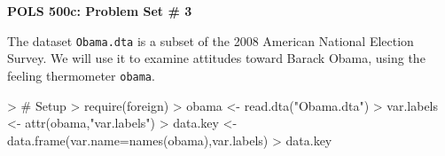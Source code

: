 \documentclass[12pt]{article}
\begin{document}


\pagestyle{empty}

\begin{center}
{\Large \textbf{POLS 500c: Problem Set \# 3}}
\end{center}

The dataset \texttt{Obama.dta} is a subset of the 2008 American National Election Survey.  We will use it to examine attitudes toward Barack Obama, using the feeling thermometer \texttt{obama}.

\begin{Schunk}
\begin{Sinput}
> # Setup
> require(foreign)
> obama <- read.dta("Obama.dta")
> var.labels <- attr(obama,"var.labels")
> data.key <- data.frame(var.name=names(obama),var.labels)
> data.key
\end{Sinput}
\end{Schunk}
\end{document}
